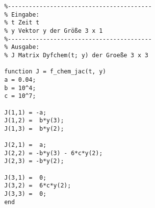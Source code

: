 \begin{lstlisting}[style=Matlab-editor]
	% J=f_chem_jac(t,y)
	%-----------------------------------------
	% Eingabe:
	% t Zeit t
	% y Vektor y der Größe 3 x 1
	%-----------------------------------------
	% Ausgabe:
	% J Matrix Dyfchem(t; y) der Groeße 3 x 3

	function J = f_chem_jac(t, y)
	a = 0.04;
	b = 10^4;
	c = 10^7;

	J(1,1) = -a;
	J(1,2) =  b*y(3); 
	J(1,3) =  b*y(2);

	J(2,1) =  a;
	J(2,2) = -b*y(3) - 6*c*y(2);
	J(2,3) = -b*y(2);

	J(3,1) =  0;
	J(3,2) =  6*c*y(2);
	J(3,3) =  0;
	end
\end{lstlisting}

